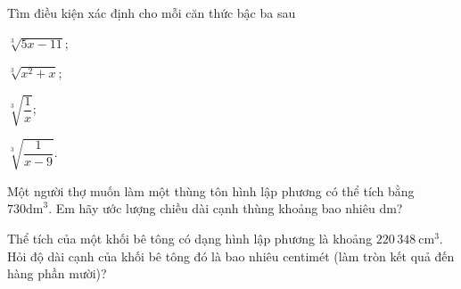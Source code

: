 \begin{bt}
	Tìm điều kiện xác định cho mỗi căn thức bậc ba sau
	\begin{listEX}[4]
	\item $\sqrt[3]{5 x-11}$;
	\item $\sqrt[3]{x^2+x}$;
	\item $\sqrt[3]{\dfrac{1}{x}}$;
	\item $\sqrt[3]{\dfrac{1}{x-9}}$.
	\end{listEX}
\end{bt}
\begin{bt}
	Một người thợ muốn làm một thùng tôn hình lập phương có thể tích bằng $730 \mathrm{dm}^3$. Em hãy ước lượng chiều dài cạnh thùng khoảng bao nhiêu dm?
\end{bt}
\begin{bt}
	Thể tích của một khối bê tông có dạng hình lập phương là khoảng $220\, 348 \mathrm{~cm}^3$. Hỏi độ dài cạnh của khối bê tông đó là bao nhiêu centimét (làm tròn kết quả đến hàng phần mười)?
\end{bt}